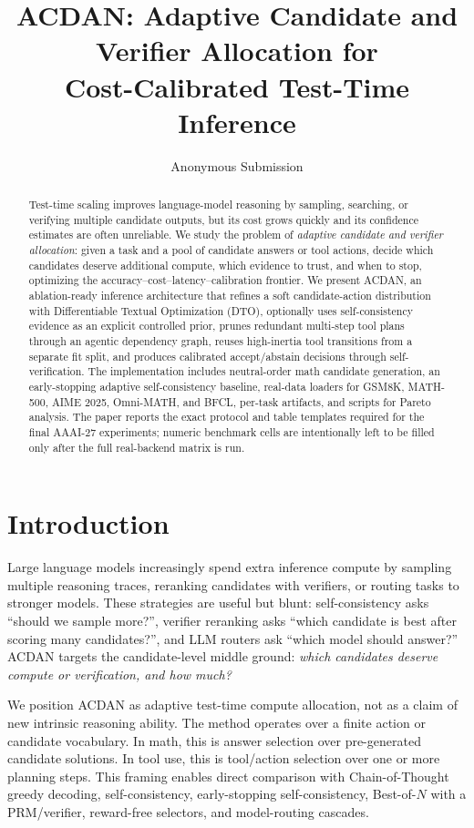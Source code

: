 \documentclass[letterpaper]{article} %
\title{ACDAN: Adaptive Candidate and Verifier Allocation for\\
Cost-Calibrated Test-Time Inference}
\author{
    Anonymous Submission
}
\begin{document}
\maketitle

\begin{abstract}
Test-time scaling improves language-model reasoning by sampling, searching, or
verifying multiple candidate outputs, but its cost grows quickly and its
confidence estimates are often unreliable. We study the problem of
\emph{adaptive candidate and verifier allocation}: given a task and a pool of
candidate answers or tool actions, decide which candidates deserve additional
compute, which evidence to trust, and when to stop, optimizing the
accuracy--cost--latency--calibration frontier. We present ACDAN, an
ablation-ready inference architecture that refines a soft candidate-action
distribution with Differentiable Textual Optimization (DTO), optionally uses
self-consistency evidence as an explicit controlled prior, prunes redundant
multi-step tool plans through an agentic dependency graph, reuses high-inertia
tool transitions from a separate fit split, and produces calibrated
accept/abstain decisions through self-verification. The implementation includes
neutral-order math candidate generation, an early-stopping adaptive
self-consistency baseline, real-data loaders for GSM8K, MATH-500, AIME 2025,
Omni-MATH, and BFCL, per-task artifacts, and scripts for Pareto analysis. The
paper reports the exact protocol and table templates required for the final
AAAI-27 experiments; numeric benchmark cells are intentionally left to be filled
only after the full real-backend matrix is run.
\end{abstract}

\section{Introduction}
Large language models increasingly spend extra inference compute by sampling
multiple reasoning traces, reranking candidates with verifiers, or routing tasks
to stronger models. These strategies are useful but blunt: self-consistency asks
``should we sample more?'', verifier reranking asks ``which candidate is best
after scoring many candidates?'', and LLM routers ask ``which model should
answer?'' ACDAN targets the candidate-level middle ground: \emph{which candidates
deserve compute or verification, and how much?}

We position ACDAN as adaptive test-time compute allocation, not as a claim of
new intrinsic reasoning ability. The method operates over a finite action or
candidate vocabulary. In math, this is answer selection over pre-generated
candidate solutions. In tool use, this is tool/action selection over one or more
planning steps. This framing enables direct comparison with Chain-of-Thought
greedy decoding, self-consistency, early-stopping self-consistency,
Best-of-$N$ with a PRM/verifier, reward-free selectors, and model-routing
cascades.
\end{document}

